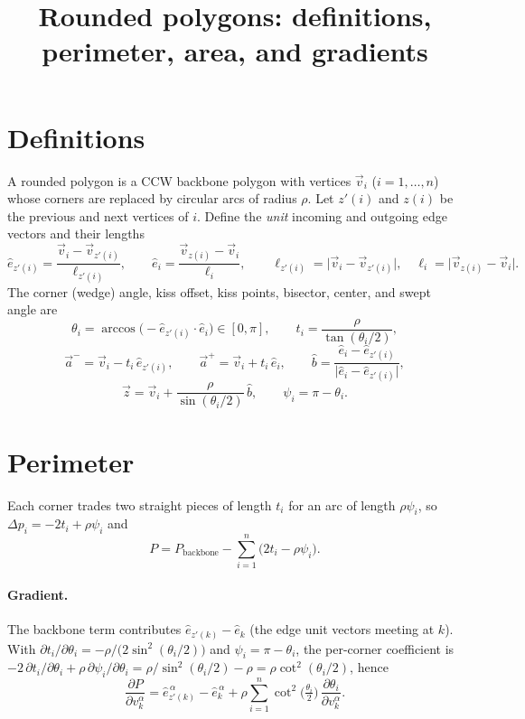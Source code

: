 \documentclass[11pt]{article}
\title{Rounded polygons: definitions, perimeter, area, and gradients}
\date{}
\author{}
\newcommand{\eh}[1]{\hat{e}_{#1}}        %
\newcommand{\dd}[2]{\frac{\partial #1}{\partial #2}}
\begin{document}
\maketitle

\section{Definitions}

A rounded polygon is a CCW backbone polygon with vertices $\vec v_i$ ($i=1,\dots,n$) whose
corners are replaced by circular arcs of radius $\rho$. Let $z'(i)$ and $z(i)$ be the
previous and next vertices of $i$. Define the \emph{unit} incoming and outgoing edge
vectors and their lengths
\[
  \eh{z'(i)} = \frac{\vec v_i - \vec v_{z'(i)}}{\ell_{z'(i)}},\qquad
  \eh{i}     = \frac{\vec v_{z(i)} - \vec v_i}{\ell_i},\qquad
  \ell_{z'(i)} = \lvert \vec v_i - \vec v_{z'(i)}\rvert,\quad
  \ell_i = \lvert \vec v_{z(i)} - \vec v_i\rvert .
\]
The corner (wedge) angle, kiss offset, kiss points, bisector, center, and swept angle are
\[
  \theta_i = \arccos\!\big(-\eh{z'(i)}\cdot\eh{i}\big)\in[0,\pi],\qquad
  t_i = \frac{\rho}{\tan(\theta_i/2)},
\]
\[
  \vec a^- = \vec v_i - t_i\,\eh{z'(i)},\qquad
  \vec a^+ = \vec v_i + t_i\,\eh{i},\qquad
  \hat b = \frac{\eh{i}-\eh{z'(i)}}{\lvert \eh{i}-\eh{z'(i)}\rvert},
\]
\[
  \vec z = \vec v_i + \frac{\rho}{\sin(\theta_i/2)}\,\hat b,\qquad
  \psi_i = \pi - \theta_i .
\]

\section{Perimeter}

Each corner trades two straight pieces of length $t_i$ for an arc of length $\rho\psi_i$, so
$\Delta p_i = -2t_i + \rho\psi_i$ and
\[
  P = P_{\text{backbone}} - \sum_{i=1}^{n}\big(2t_i - \rho\psi_i\big).
\]

\paragraph{Gradient.}
The backbone term contributes $\eh{z'(k)} - \eh{k}$ (the edge unit vectors meeting at $k$).
With $\partial t_i/\partial\theta_i = -\rho/\big(2\sin^2(\theta_i/2)\big)$ and
$\psi_i = \pi-\theta_i$, the per-corner coefficient is
$-2\,\partial t_i/\partial\theta_i + \rho\,\partial\psi_i/\partial\theta_i
 = \rho/\sin^2(\theta_i/2) - \rho = \rho\cot^2(\theta_i/2)$, hence
\[
  \boxed{\;
  \dd{P}{v_k^\alpha}
  = \eh{z'(k)}^{\,\alpha} - \eh{k}^{\,\alpha}
    + \rho\sum_{i=1}^{n}\cot^2\!\Big(\tfrac{\theta_i}{2}\Big)\,\dd{\theta_i}{v_k^\alpha}.
  \;}
\]
\end{document}
